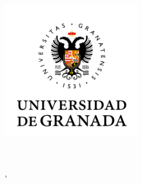 \begin{titlepage}
    \begin{center}
        \large

        \hfill

        \hfill

        \begingroup
            \color{Maroon}\spacedallcaps{\myTitle} \\ \bigskip
        \endgroup

        \spacedlowsmallcaps{\myName}

        \vfill

        \includegraphics[width=6cm]{gfx/UGRlogo.png} \\ \medskip


        \myTime\

        \vfill

        \myProf, \myOtherProf \\
        \myUni \\ \bigskip


    \end{center}

\end{titlepage}
